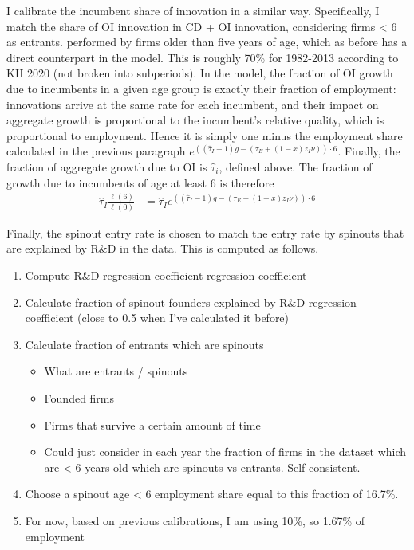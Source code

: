 \documentclass[12pt,english]{article}
\theoremstyle{remark}
\begin{document}
I calibrate the incumbent share of innovation in a similar way. Specifically, I match the share of OI innovation in CD + OI innovation, considering firms < 6 as entrants. performed by firms older than five years of age, which as before has a direct counterpart in the model. This is roughly 70\% for 1982-2013 according to KH 2020 (not broken into subperiods). In the model, the fraction of OI growth due to incumbents in a given age group is exactly their fraction of employment: innovations arrive at the same rate for each incumbent, and their impact on aggregate growth is proportional to the incumbent's relative quality, which is proportional to employment. Hence it is simply one minus the employment share calculated in the previous paragraph $e^{((\hat{\tau}_I -1)g - (\tau_E + (1-x)z_I \nu))\cdot 6}$. Finally, the fraction of aggregate growth due to OI is $\hat{\tau}_i$, defined above. The fraction of growth due to incumbents of age at least 6 is therefore
\begin{align*}
	\hat{\tau}_I \frac{\ell(6)}{\ell(0)} &= \hat{\tau}_I e^{((\hat{\tau}_I -1)g - (\tau_E + (1-x)z_I \nu))\cdot 6} 
\end{align*}

Finally, the spinout entry rate is chosen to match the entry rate by spinouts that are explained by R\&D in the data. This is computed as follows. 

\footnotesize
\begin{enumerate}
	\item Compute R\&D regression coefficient regression coefficient
	\item Calculate fraction of spinout founders explained by R\&D regression coefficient (close to 0.5 when I've calculated it before)
	\item Calculate fraction of entrants which are spinouts
	\begin{itemize}
		\item What are entrants / spinouts
		\item Founded firms
		\item Firms that survive a certain amount of time
		\item Could just consider in each year the fraction of firms in the dataset which are < 6 years old which are spinouts vs entrants. Self-consistent.
	\end{itemize}
	\item Choose a spinout age < 6 employment share equal to this fraction of 16.7\%.
	\item For now, based on previous calibrations, I am using 10\%, so 1.67\% of employment
\end{enumerate}
\end{document}
